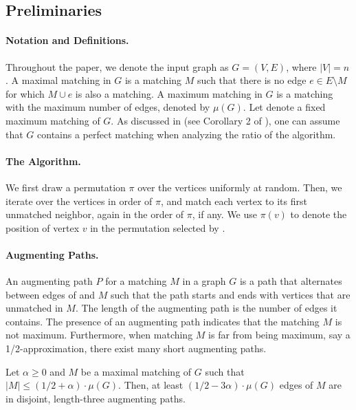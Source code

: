 \subsection{Preliminaries}

\paragraph{Notation and Definitions.} Throughout the paper, we denote the input graph as $G = (V, E)$, where $|V| = n$. A maximal matching in $G$ is a matching $M$ such that there is no edge $e \in E \setminus M$ for which $M \cup e$ is also a matching. A maximum matching in $G$ is a matching with the maximum number of edges, denoted by $\mu(G)$. Let \opt{} denote a fixed maximum matching of $G$. As discussed in \cite{DBLP:conf/focs/GoelT12, poloczek2012randomized} (see Corollary 2 of \cite{poloczek2012randomized}), one can assume that $G$ contains a perfect matching when analyzing the ratio of the \rnk{} algorithm.

\paragraph{The \rnk{} Algorithm.} We first draw a permutation $\pi$ over the vertices uniformly at random. Then, we iterate over the vertices in order of $\pi$, and match each vertex to its first unmatched neighbor, again in the order of $\pi$, if any. We use $\pi(v)$ to denote the position of vertex $v$ in the permutation selected by \rnk{}.


\paragraph{Augmenting Paths.} An augmenting path $P$ for a matching $M$ in a graph $G$ is a path that alternates between edges of \opt{} and $M$ such that the path starts and ends with vertices that are unmatched in $M$.  The length of the augmenting path is the number of edges it contains. The presence of an augmenting path indicates that the matching $M$ is not maximum. Furthermore, when matching $M$ is far from being maximum, say a 1/2-approximation, there exist many short augmenting paths.


\begin{proposition}\label{prop:aug3-path-bound}
Let $\alpha \geq 0$ and $M$ be a maximal matching of $G$ such that $|M| \leq (1/2 + \alpha) \cdot \mu(G)$. Then, at least $(1/2 - 3\alpha)\cdot \mu(G)$ edges of $M$ are in disjoint, length-three augmenting paths.
\end{proposition}





